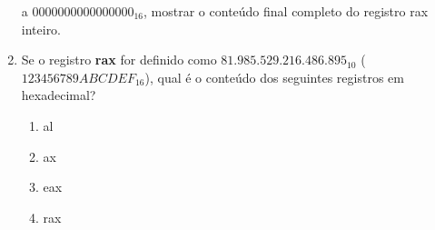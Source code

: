 \begin{enumerate}
    a $ 0000000000000000_{16} $, mostrar o conteúdo final completo do registro rax inteiro.
    \item Se o registro \textbf{rax} for definido como $ 81.985.529.216.486.895_{10} $ ($ 123456789ABCDEF_{16} $), qual é o conteúdo dos seguintes registros em hexadecimal?
    \begin{enumerate}
    	\item al
    	\item ax
    	\item eax
    	\item rax
    \end{enumerate}
\end{enumerate}